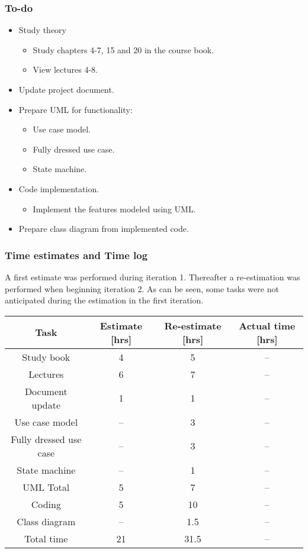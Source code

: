 \documentclass[12pt, letterpaper]{article}
\begin{document}
\subsubsection{To-do}
\begin{itemize}
	\item Study theory
	\begin{itemize}
		\item Study chapters 4-7, 15 and 20 in the course book.
		\item View lectures 4-8.
	\end{itemize}
	\item Update project document.
	\item Prepare UML for functionality:
	\begin{itemize}
		\item Use case model.
		\item Fully dressed use case.
		\item State machine.
	\end{itemize}
	\item Code implementation.
	\begin{itemize}
		\item Implement the features modeled using UML.
	\end{itemize}
	\item Prepare class diagram from implemented code. 
\end{itemize}
\subsubsection{Time estimates and Time log}
A first estimate was performed during iteration 1. Thereafter a re-estimation was performed when beginning iteration 2. As can be seen, some tasks were not anticipated during the estimation in the first iteration.
\begin{center}
	\begin{tabular}{|c|c|c|c|} 
		\hline
		Task & Estimate [hrs] & Re-estimate [hrs] & Actual time [hrs] \\ [0.5ex] 
		\hline\hline
		Study book & 4 & 5 & --\\
		\hline
		Lectures & 6 & 7 &--\\
		\hline 
		Document update & 1 & 1 &--\\
		\hline 
		Use case model & -- & 3 & -- \\
		\hline
		Fully dressed use case & -- & 3 & --\\
		\hline
		State machine & -- & 1 & --\\
		\hline
		UML Total & 5 & 7 &-- \\
		\hline
		Coding & 5 & 10 &-- \\ 
		\hline
		Class diagram & -- & 1.5 & --\\
		\hline
		Total time & 21 & 31.5 &-- \\ [1ex]
		\hline 
	\end{tabular}
\end{center}
\end{document}
